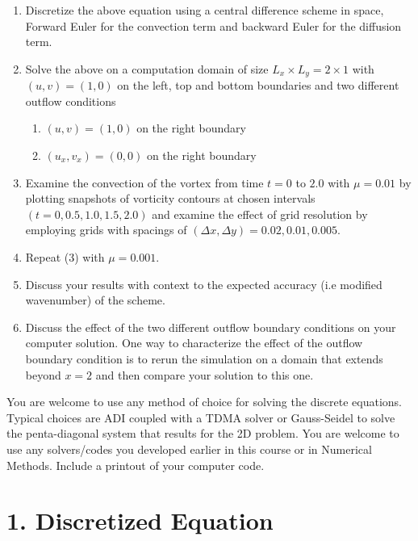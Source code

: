 \documentclass[12pt]{article}
\begin{document}
\begin{enumerate}
\item Discretize the above equation using a central difference scheme in space, Forward Euler for the convection term and backward Euler for the diffusion term.
\item Solve the above on a computation domain of size \(L_x \times L_y = 2 \times 1\) with \((u,v) = (1,0)\) on the left, top and bottom boundaries and two different outflow conditions
    \begin{enumerate}
    \item \( (u,v) = (1,0) \) on the right boundary
    \item \( (u_x, v_x) = (0,0) \) on the right boundary
    \end{enumerate}
\item Examine the convection of the vortex from time \( t=0 \) to \( 2.0 \) with \( \mu=0.01 \) by plotting snapshots of vorticity contours at chosen intervals \( (t=0, 0.5, 1.0, 1.5, 2.0) \) and examine the effect of grid resolution by employing grids with spacings of \( (\Delta x, \Delta y) = 0.02, 0.01, 0.005 \).
\item Repeat (3) with \( \mu=0.001 \).
\item Discuss your results with context to the expected accuracy (i.e modified wavenumber) of the scheme.
\item Discuss the effect of the two different outflow boundary conditions on your computer solution. One way to characterize the effect of the outflow boundary condition is to rerun the simulation on a domain that extends beyond \( x=2 \) and then compare your solution to this one.
\end{enumerate}

You are welcome to use any method of choice for solving the discrete equations. Typical choices are ADI coupled with a TDMA solver or Gauss-Seidel to solve the penta-diagonal system that results for the 2D problem. You are welcome to use any solvers/codes you developed earlier in this course or in Numerical Methods. Include a printout of your computer code.







\section{1. Discretized Equation}
\end{document}
